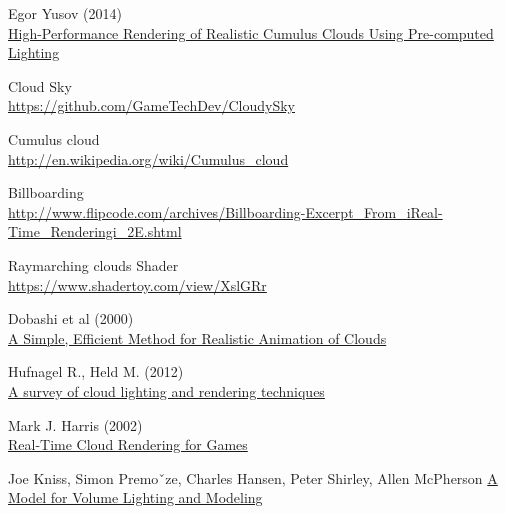 Egor Yusov (2014) \\
\ul{High-Performance Rendering of Realistic Cumulus Clouds
Using Pre-computed Lighting}

Cloud Sky \\
\ul{https://github.com/GameTechDev/CloudySky}

Cumulus cloud \\
\ul{http://en.wikipedia.org/wiki/Cumulus\_cloud}

Billboarding \\
\ul{http://www.flipcode.com/archives/Billboarding-Excerpt\_From\_iReal-Time\_Renderingi\_2E.shtml}

Raymarching clouds Shader \\
\ul{https://www.shadertoy.com/view/XslGRr}

Dobashi et al (2000) \\
\ul{A Simple, Efficient Method for Realistic Animation of Clouds}

Hufnagel R., Held M. (2012) \\
\ul{A survey of cloud lighting and rendering techniques}

Mark J. Harris (2002) \\
\ul{Real-Time Cloud Rendering for Games}

Joe Kniss, Simon Premoˇze, Charles Hansen, Peter Shirley, Allen McPherson 
\ul{A Model for Volume Lighting and Modeling}
